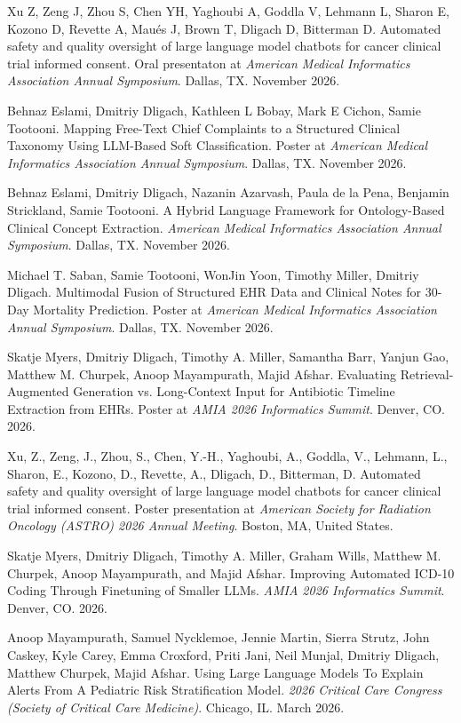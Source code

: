 \documentclass[letterpaper]{article}
\renewenvironment{itemize}{
  \begin{list}{}{
    \setlength{\leftmargin}{1.5em}
  }
}{
  \end{list}
}
\begin{document}
\begin{itemize}
\item Xu Z, Zeng J, Zhou S, Chen YH, Yaghoubi A, Goddla V, Lehmann L, Sharon E, Kozono D, Revette A, Maués J, Brown T, Dligach D, Bitterman D. Automated safety and quality oversight of large language model chatbots for cancer clinical trial informed consent. Oral presentaton at \emph{American Medical Informatics Association Annual Symposium}. Dallas, TX. November 2026.
\item Behnaz Eslami, Dmitriy Dligach, Kathleen L Bobay, Mark E Cichon, Samie Tootooni. Mapping Free-Text Chief Complaints to a Structured Clinical Taxonomy Using LLM-Based Soft Classification. Poster at \emph{American Medical Informatics Association Annual Symposium}. Dallas, TX. November 2026.
\item Behnaz Eslami, Dmitriy Dligach, Nazanin Azarvash, Paula de la Pena, Benjamin Strickland, Samie Tootooni. A Hybrid Language Framework for Ontology-Based Clinical Concept Extraction. \emph{American Medical Informatics Association Annual Symposium}. Dallas, TX. November 2026.
\item Michael T. Saban, Samie Tootooni, WonJin Yoon, Timothy Miller, Dmitriy Dligach. Multimodal Fusion of Structured EHR Data and Clinical Notes for 30-Day Mortality Prediction. Poster at \emph{American Medical Informatics Association Annual Symposium}. Dallas, TX. November 2026.
\item Skatje Myers, Dmitriy Dligach, Timothy A. Miller, Samantha Barr, Yanjun Gao, Matthew M. Churpek, Anoop Mayampurath, Majid Afshar. Evaluating Retrieval-Augmented Generation vs. Long-Context Input for Antibiotic Timeline Extraction from EHRs. Poster at \emph{AMIA 2026 Informatics Summit}. Denver, CO. 2026.
\item Xu, Z., Zeng, J., Zhou, S., Chen, Y.-H., Yaghoubi, A., Goddla, V., Lehmann, L., Sharon, E., Kozono, D., Revette, A., Dligach, D., Bitterman, D. Automated safety and quality oversight of large language model chatbots for cancer clinical trial informed consent. Poster presentation at \emph{American Society for Radiation Oncology (ASTRO) 2026 Annual Meeting}. Boston, MA, United States.
\item Skatje Myers, Dmitriy Dligach, Timothy A. Miller, Graham Wills, Matthew M. Churpek, Anoop Mayampurath, and Majid Afshar. Improving Automated ICD-10 Coding Through Finetuning of Smaller LLMs. \emph{AMIA 2026 Informatics Summit}. Denver, CO. 2026.
\item Anoop Mayampurath, Samuel Nycklemoe, Jennie Martin, Sierra Strutz, John Caskey, Kyle Carey, Emma Croxford, Priti Jani, Neil Munjal, Dmitriy Dligach, Matthew Churpek, Majid Afshar. Using Large Language Models To Explain Alerts From A Pediatric Risk Stratification Model. \emph{2026 Critical Care Congress (Society of Critical Care Medicine)}. Chicago, IL. March 2026.

\end{itemize}
\end{document}
